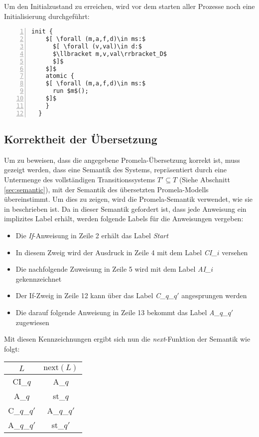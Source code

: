 Um den Initialzustand zu erreichen, wird vor dem starten aller Prozesse noch eine Initialisierung durchgeführt:
\begin{lstlisting}[language=Promela,mathescape=true,numbers=left,numberstyle=\small,caption={Initialisierungsprozess}]
  init {
    $[ \forall (m,a,f,d)\in ms:$
      $[ \forall (v,val)\in d:$
      $\llbracket m,v,val\rrbracket_D$
      $]$
    $]$
    atomic {
    $[ \forall (m,a,f,d)\in ms:$
      run $m$();
    $]$
    }
  }
\end{lstlisting}

\subsection{Korrektheit der Übersetzung}
Um zu beweisen, dass die angegebene Promela-Übersetzung korrekt ist, muss gezeigt werden, dass eine Semantik des Systems, repräsentiert durch eine Untermenge des vollständigen Transitionssystems $T'\subseteq T$ (Siehe Abschnitt \ref{sec:semantic}), mit der Semantik des übersetzten Promela-Modells übereinstimmt.
Um dies zu zeigen, wird die Promela-Semantik verwendet, wie sie in \cite{Gallardo04formalaspects} beschrieben ist.
Da in dieser Semantik gefordert ist, dass jede Anweisung ein implizites Label erhält, werden folgende Labels für die Anweisungen vergeben:
\begin{itemize}
\item Die \emph{If}-Anweisung in Zeile 2 erhält das Label \emph{Start}
\item In diesem Zweig wird der Ausdruck in Zeile 4 mit dem Label \emph{CI\_$i$} versehen
\item Die nachfolgende Zuweisung in Zeile 5 wird mit dem Label \emph{AI\_$i$} gekennzeichnet
\item Der If-Zweig in Zeile 12 kann über das Label \emph{C\_$q$\_$q'$} angesprungen werden
\item Die darauf folgende Anweisung in Zeile 13 bekommt das Label \emph{A\_$q$\_$q'$} zugewiesen
\end{itemize}

Mit diesen Kennzeichnungen ergibt sich nun die \emph{next}-Funktion der Semantik wie folgt:

\begin{tabular}{|c|c|}
  \hline
  $L$ & $\textrm{next}(L)$\\
  \hline
  CI\_$q$ & A\_$q$\\
  A\_$q$ & st\_$q$\\
  C\_$q$\_$q'$ & A\_$q$\_$q'$\\
  A\_$q$\_$q'$ & st\_$q'$\\
  \hline
\end{tabular}

